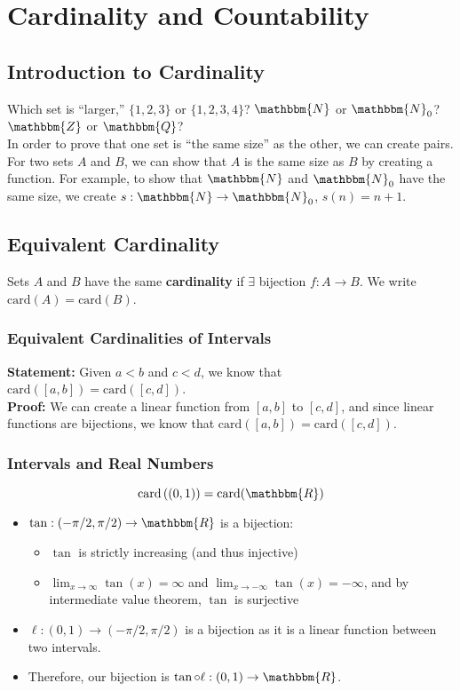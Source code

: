 \documentclass[10pt]{extarticle}
\begin{document}
  \section{Cardinality and Countability}%
  \subsection{Introduction to Cardinality}%
    Which set is ``larger,'' $\{1,2,3\}$ or $\{1,2,3,4\}$? $\mathbbm{N}$ or $\mathbbm{N}_0$? $\mathbbm{Z}$ or $\mathbbm{Q}$?\\

    In order to prove that one set is ``the same size'' as the other, we can create pairs. For two sets $A$ and $B$, we can show that $A$ is the same size as $B$ by creating a function. For example, to show that $\mathbbm{N}$ and $\mathbbm{N}_0$ have the same size, we create $s:\mathbbm{N} \rightarrow \mathbbm{N}_0$, $s(n) = n+1$.
  \subsection{Equivalent Cardinality}%
      Sets $A$ and $B$ have the same \textbf{cardinality} if $\exists$ bijection $f:A\rightarrow B$. We write $\text{card}(A) = \text{card}(B)$.
      \subsubsection{Equivalent Cardinalities of Intervals}%
      \textbf{Statement:} Given $a<b$ and $c<d$, we know that $\text{card}\left([a,b]\right) = \text{card}\left([c,d]\right)$.\\

      \textbf{Proof:} We can create a linear function from $[a,b]$ to $[c,d]$, and since linear functions are bijections, we know that $\text{card}\left([a,b]\right) = \text{card}\left([c,d]\right)$.\\
      \subsubsection{Intervals and Real Numbers}%
      \[
        \text{card}\left((0,1)\right) = \text{card}(\mathbbm{R})
      \] 
      \begin{itemize}
        \item $\tan: (-\pi/2,\pi/2) \rightarrow \mathbbm{R}$ is a bijection:
          \begin{itemize}
            \item $\tan$ is strictly increasing (and thus injective)
            \item $\lim_{x\rightarrow\infty} \tan(x) = \infty$ and $\lim_{x\rightarrow -\infty}\tan(x) = -\infty$, and by intermediate value theorem, $\tan$ is surjective
          \end{itemize}
        \item $\ell: (0,1) \rightarrow (-\pi/2,\pi/2)$ is a bijection as it is a linear function between two intervals.
        \item Therefore, our bijection is $\tan \circ \ell: (0,1) \rightarrow \mathbbm{R}$.
      \end{itemize}
\end{document}
